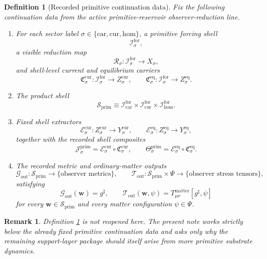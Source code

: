 \documentclass[11pt]{article}
\newcommand{\CompletedMetric}{g^{\sharp}}
\newcommand{\Car}{\mathrm{car}}
\newcommand{\Cur}{\mathrm{cur}}
\newcommand{\Hom}{\mathrm{hom}}
\newcommand{\ForSpace}[1]{\mathcal I_{#1}^{\mathrm{for}}}
\newcommand{\PrimShell}{\mathcal S_{\mathrm{prim}}}
\newcommand{\Reduction}[1]{\mathcal R_{#1}}
\newcommand{\CurrentCarrier}[1]{\mathfrak C_{#1}^{\mathrm{cur}}}
\newcommand{\EqCarrier}[1]{\mathfrak C_{#1}^{\mathrm{eq}}}
\newcommand{\CurrentExtract}[1]{\mathscr E_{#1}^{\mathrm{cur}}}
\newcommand{\EqExtract}[1]{\mathscr E_{#1}^{\mathrm{eq}}}
\newcommand{\PrimCurrent}[1]{\mathcal J_{#1}^{\mathrm{prim}}}
\newcommand{\PrimTheta}[1]{\Theta_{#1}^{\mathrm{prim}}}
\newcommand{\MetricOut}{\mathscr G_{\mathrm{out}}}
\newcommand{\MatterOut}{\mathscr T_{\mathrm{out}}}
\newtheorem{definition}{Definition}
\newtheorem{remark}{Remark}
\begin{document}
\begin{definition}[Recorded primitive continuation data]
\label{def:fixed}
Fix the following continuation data from the active primitive-reservoir observer-reduction line.
\begin{enumerate}
    \item For each sector label \(\sigma\in\{\Car,\Cur,\Hom\}\), a primitive forcing shell
    \[
    \ForSpace{\sigma},
    \]
    a visible reduction map
    \[
    \Reduction{\sigma}:\ForSpace{\sigma}\to X_{\sigma},
    \]
    and shell-level current and equilibrium carriers
    \[
    \CurrentCarrier{\sigma}:\ForSpace{\sigma}\to Z_{\sigma}^{\mathrm{cur}},
    \qquad
    \EqCarrier{\sigma}:\ForSpace{\sigma}\to Z_{\sigma}^{\mathrm{eq}}.
    \]
    \item The product shell
    \[
    \PrimShell
    \equiv
    \ForSpace{\Car}\times \ForSpace{\Cur}\times \ForSpace{\Hom}.
    \]
    \item Fixed shell extractors
    \[
    \CurrentExtract{\sigma}:Z_{\sigma}^{\mathrm{cur}}\to Y_{\sigma}^{\mathrm{cur}},
    \qquad
    \EqExtract{\sigma}:Z_{\sigma}^{\mathrm{eq}}\to Y_{\sigma}^{\mathrm{eq}},
    \]
    together with the recorded shell composites
    \begin{equation}
    \PrimCurrent{\sigma}
    =
    \CurrentExtract{\sigma}\circ \CurrentCarrier{\sigma},
    \qquad
    \PrimTheta{\sigma}
    =
    \EqExtract{\sigma}\circ \EqCarrier{\sigma}.
    \label{eq:primcomposites}
    \end{equation}
    \item The recorded metric and ordinary-matter outputs
    \[
    \MetricOut:\PrimShell\to\{\text{observer metrics}\},
    \qquad
    \MatterOut:\PrimShell\times\Psi\to\{\text{observer stress tensors}\},
    \]
    satisfying
    \begin{equation}
    \MetricOut(\mathbf w)=\CompletedMetric,
    \qquad
    \MatterOut(\mathbf w,\psi)
    =
    T_{\mu\nu}^{\mathrm{matter}}[\CompletedMetric,\psi]
    \label{eq:fixedoutputs}
    \end{equation}
    for every \(\mathbf w\in\PrimShell\) and every matter configuration \(\psi\in\Psi\).
\end{enumerate}
\end{definition}

\begin{remark}
Definition \ref{def:fixed} is not reopened here. The present note works strictly below the already fixed primitive continuation data and asks only why the remaining support-layer package should itself arise from more primitive substrate dynamics.
\end{remark}
\end{document}
